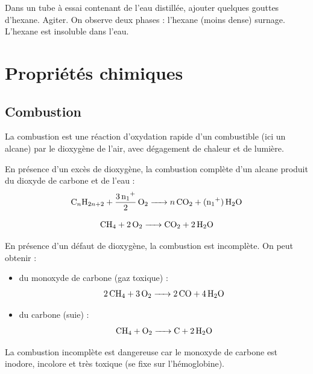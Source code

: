 \begin{experience}
Dans un tube à essai contenant de l'eau distillée, ajouter quelques gouttes d'hexane. Agiter. On observe deux phases : l'hexane (moins dense) surnage. L'hexane est insoluble dans l'eau.
\end{experience}

\section{Propriétés chimiques}

\subsection{Combustion}

\begin{definition}[Combustion]
La combustion est une réaction d'oxydation rapide d'un combustible (ici un alcane) par le dioxygène de l'air, avec dégagement de chaleur et de lumière.
\end{definition}

\begin{propriete}
En présence d'un excès de dioxygène, la combustion complète d'un alcane produit du dioxyde de carbone et de l'eau :
\[
\ce{C_nH_{2n+2} + \frac{3n+1}{2} O2 -> n CO2 + (n+1) H2O}
\]
\end{propriete}

\begin{exemple}
\[
\ce{CH4 + 2 O2 -> CO2 + 2 H2O}
\]
\end{exemple}

\begin{propriete}
En présence d'un défaut de dioxygène, la combustion est incomplète. On peut obtenir :
\begin{itemize}
    \item du monoxyde de carbone  (gaz toxique) :
    \[
    \ce{2 CH4 + 3 O2 -> 2 CO + 4 H2O}
    \]
    \item du carbone (suie) :
    \[
    \ce{CH4 + O2 -> C + 2 H2O}
    \]
\end{itemize}
\end{propriete}

\begin{remarque}
La combustion incomplète est dangereuse car le monoxyde de carbone  est inodore, incolore et très toxique (se fixe sur l'hémoglobine).
\end{remarque}

